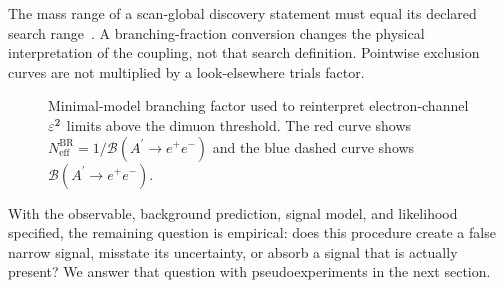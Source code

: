 The mass range of a scan-global discovery statement must equal its declared
search range~\cite{GrossVitells2010}. A branching-fraction conversion changes the
physical interpretation of the coupling, not that search definition. Pointwise
\CLs{} exclusion curves are not multiplied by a look-elsewhere trials factor.

\begin{figure}[H]
\centering
{}
\caption{Minimal-model branching factor used to reinterpret electron-channel
$\varepsilon^2$ limits above the dimuon threshold. The red curve shows
$N_{\mathrm{eff}}^{\mathrm{BR}}=1/\mathcal{B}(A^\prime\to e^+e^-)$ and the blue dashed
curve shows $\mathcal{B}(A^\prime\to e^+e^-)$.}
\label{fig:methodology-dimuon-factor}
\end{figure}

With the observable, background prediction, signal model, and likelihood specified,
the remaining question is empirical: does this procedure create a false narrow signal,
misstate its uncertainty, or absorb a signal that is actually present? We answer that
question with pseudoexperiments in the next section.
